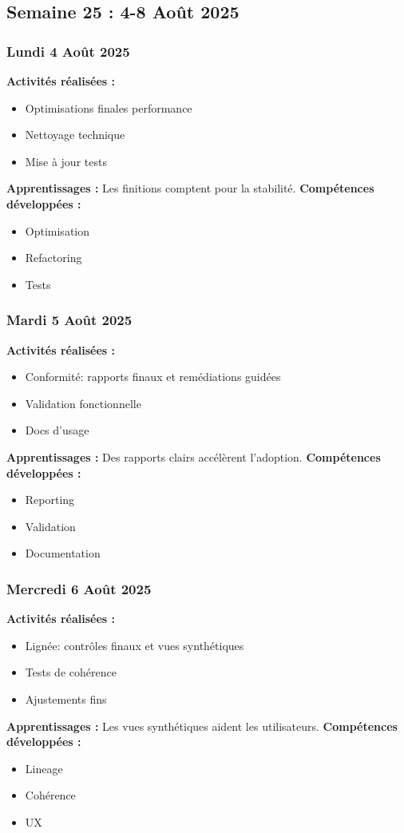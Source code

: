 \documentclass[12pt,a4paper]{article}
\begin{document}
\clearpage
\subsection{Semaine 25 : 4-8 Août 2025}

\subsubsection{Lundi 4 Août 2025}
\textbf{Activités réalisées :}
\begin{itemize}
    \item Optimisations finales performance
    \item Nettoyage technique
    \item Mise à jour tests
\end{itemize}
\textbf{Apprentissages :} Les finitions comptent pour la stabilité.
\textbf{Compétences développées :}
\begin{itemize}
    \item Optimisation
    \item Refactoring
    \item Tests
\end{itemize}

\subsubsection{Mardi 5 Août 2025}
\textbf{Activités réalisées :}
\begin{itemize}
    \item Conformité: rapports finaux et remédiations guidées
    \item Validation fonctionnelle
    \item Docs d'usage
\end{itemize}
\textbf{Apprentissages :} Des rapports clairs accélèrent l'adoption.
\textbf{Compétences développées :}
\begin{itemize}
    \item Reporting
    \item Validation
    \item Documentation
\end{itemize}

\subsubsection{Mercredi 6 Août 2025}
\textbf{Activités réalisées :}
\begin{itemize}
    \item Lignée: contrôles finaux et vues synthétiques
    \item Tests de cohérence
    \item Ajustements fins
\end{itemize}
\textbf{Apprentissages :} Les vues synthétiques aident les utilisateurs.
\textbf{Compétences développées :}
\begin{itemize}
    \item Lineage
    \item Cohérence
    \item UX
\end{itemize}
\end{document}
